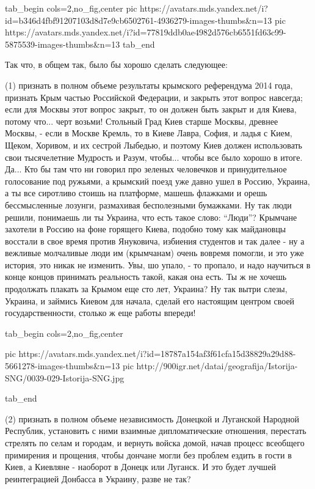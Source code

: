 \ifcmt
  tab_begin cols=2,no_fig,center
     pic https://avatars.mds.yandex.net/i?id=b346d4fbf91207103d8d7e9cb6502761-4936279-images-thumbs&n=13
     pic https://avatars.mds.yandex.net/i?id=77819ddb0ae4982d576cb6551fd63c99-5875539-images-thumbs&n=13
  tab_end
\fi

Так что, в общем так, было бы хорошо сделать следующее:

(1) признать в полном объеме результаты крымского референдума 2014 года,
признать Крым частью Российской Федерации, и закрыть этот вопрос навсегда; если
для Москвы этот вопрос закрыт, то он должен быть закрыт и для Киева, потому
что...  черт возьми! Стольный Град Киев старше Москвы, древнее Москвы, - если в
Москве Кремль, то в Киеве Лавра, София, и ладья с Кием, Щеком, Хоривом, и их
сестрой Лыбедью, и поэтому Киев должен использовать свои тысячелетние Мудрость
и Разум, чтобы... чтобы все было хорошо в итоге.  Да... Кто бы там что ни
говорил про зеленых человечков и принудительное голосование под ружьями, а
крымский поезд уже давно ушел в Россию, Украина, а ты все сиротливо стоишь на
платформе, машешь флажками и орешь бессмысленные лозунги, размахивая
бесполезными бумажками. Ну так люди решили, понимаешь ли ты Украина, что есть
такое слово: \enquote{Люди}? Крымчане захотели в Россию на фоне горящего Киева,
подобно тому как майдановцы восстали в свое время против Януковича, избиения
студентов и так далее - ну а вежливые молчаливые люди им (крымчанам) очень
вовремя помогли, и это уже история, это никак не изменить. Увы, шо упало, - то
пропало, и надо научиться в конце концов принимать реальность такой, какая она
есть. Ты ж не хочешь продолжать плакать за Крымом еще сто лет, Украина? Ну так
вытри слезы, Украина, и займись Киевом для начала, сделай его настоящим центром
своей государственности, столько ж еще работы впереди!

\ifcmt
  tab_begin cols=2,no_fig,center

     pic https://avatars.mds.yandex.net/i?id=18787a154af3f61cfa15d38829a29d88-5661278-images-thumbs&n=13
     pic http://900igr.net/datai/geografija/Istorija-SNG/0039-029-Istorija-SNG.jpg 

  tab_end
\fi

(2) признать в полном объеме независимость Донецкой и Луганской Народной
Республик, установить с ними взаимные дипломатические отношения, перестать
стрелять по селам и городам, и вернуть войска домой, начав процесс всеобщего
примирения и прощения, чтобы дончане могли без проблем ездить в гости в Киев, а
Киевляне - наоборот в Донецк или Луганск. И это будет лучшей реинтеграцией
Донбасса в Украину, разве не так?
